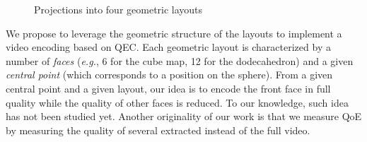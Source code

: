 \begin{figure}[t]
\centering
{}
\caption{Projections into four geometric layouts}\label{fig:mapping}
\end{figure}

We propose to leverage the geometric
structure of the layouts to implement a video encoding based on
\ac{QEC}. Each geometric layout is characterized by a number of
\emph{faces} (\textit{e.g.}, 6 for the cube map, 12 for the
dodecahedron) and a given \emph{central point} (which corresponds to a
position on the sphere).
From a given central point and a given layout, our idea is to encode
the front face in full quality while the quality of other faces is
reduced.
To our knowledge, such idea has not been studied yet.
Another originality of our work is that we measure \ac{QoE} by
measuring the quality of several extracted  instead of
the full video.

